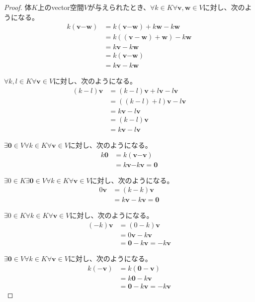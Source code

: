 \documentclass[dvipdfmx]{jsarticle}
\begin{document}
\begin{proof}
体$K$上のvector空間$V$が与えられたとき、$\forall k \in K\forall\mathbf{v},\mathbf{w} \in V$に対し、次のようになる。
\begin{align*}
k\left( \mathbf{v}\mathbf{-}\mathbf{w} \right) &= k\left( \mathbf{v}\mathbf{-}\mathbf{w} \right) + k\mathbf{w} - k\mathbf{w}\\
&=k\left( \left( \mathbf{v} - \mathbf{w} \right) + \mathbf{w} \right) - k\mathbf{w}\\
&=k\mathbf{v} - k\mathbf{w}\\
&=k\left( \mathbf{v}\mathbf{-}\mathbf{w} \right)\\
&= k\mathbf{v} - k\mathbf{w}
\end{align*}\par
$\forall k,l \in K\forall\mathbf{v} \in V$に対し、次のようになる。
\begin{align*}
(k - l)\mathbf{v} &= (k - l)\mathbf{v} + l\mathbf{v} - l\mathbf{v}\\
&=\left( (k - l) + l \right)\mathbf{v} - l\mathbf{v}\\
&=k\mathbf{v} - l\mathbf{v}\\
&=(k - l)\mathbf{v}\\
&= k\mathbf{v} - l\mathbf{v}
\end{align*}\par
$\exists\mathbf{0} \in V\forall k \in K\forall\mathbf{v} \in V$に対し、次のようになる。
\begin{align*}
k\mathbf{0} &= k\left( \mathbf{v}\mathbf{-}\mathbf{v} \right)\\
&= k\mathbf{v}\mathbf{-}k\mathbf{v} = \mathbf{0}
\end{align*}\par
$\exists 0 \in K\exists\mathbf{0} \in V\forall k \in K\forall\mathbf{v} \in V$に対し、次のようになる。
\begin{align*}
0\mathbf{v} &= (k - k)\mathbf{v}\\
&= k\mathbf{v} - k\mathbf{v} = \mathbf{0}
\end{align*}\par
$\exists 0 \in K\forall k \in K\forall\mathbf{v} \in V$に対し、次のようになる。
\begin{align*}
( - k)\mathbf{v} &= (0 - k)\mathbf{v}\\
&= 0\mathbf{v} - k\mathbf{v}\\
&= \mathbf{0} - k\mathbf{v} = - k\mathbf{v}
\end{align*}\par
$\exists\mathbf{0} \in V\forall k \in K\forall\mathbf{v} \in V$に対し、次のようになる。
\begin{align*}
k\left( - \mathbf{v} \right) &= k\left( \mathbf{0} - \mathbf{v} \right)\\
&= k\mathbf{0} - k\mathbf{v}\\
&= \mathbf{0} - k\mathbf{v} = - k\mathbf{v}
\end{align*}
\end{proof}
\end{document}
